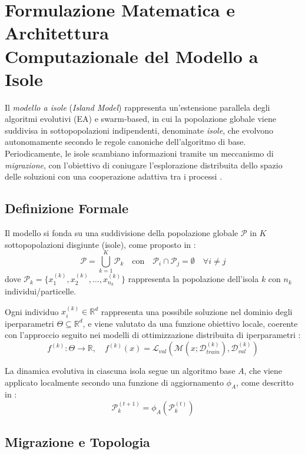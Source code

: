 \documentclass{article}
\begin{document}
\section{Formulazione Matematica e Architettura \\Computazionale del Modello a Isole}

Il \textit{modello a isole} (\textit{Island Model}) rappresenta un'estensione parallela degli algoritmi evolutivi (EA) e swarm-based, in cui la popolazione globale viene suddivisa in sottopopolazioni indipendenti, denominate \textit{isole}, che evolvono autonomamente secondo le regole canoniche dell'algoritmo di base. Periodicamente, le isole scambiano informazioni tramite un meccanismo di \textit{migrazione}, con l’obiettivo di coniugare l'esplorazione distribuita dello spazio delle soluzioni con una cooperazione adattiva tra i processi \cite{tomassini2005spatially, cantupaz1998survey}.

\subsection{Definizione Formale}

Il modello si fonda su una suddivisione della popolazione globale $\mathcal{P}$ in $K$ sottopopolazioni disgiunte (isole), come proposto in \cite{alba2002parallelism, tomassini2005spatially}:
\[
\mathcal{P} = \bigcup_{k=1}^K \mathcal{P}_k \quad \text{con} \quad \mathcal{P}_i \cap \mathcal{P}_j = \emptyset \quad \forall i \neq j
\]
dove $\mathcal{P}_k = \{x_1^{(k)}, x_2^{(k)}, \dots, x_{n_k}^{(k)}\}$ rappresenta la popolazione dell'isola $k$ con $n_k$ individui/particelle.

Ogni individuo $x_i^{(k)} \in \mathbb{R}^d$ rappresenta una possibile soluzione nel dominio degli iperparametri $\Theta \subseteq \mathbb{R}^d$, e viene valutato da una funzione obiettivo locale, coerente con l'approccio seguito nei modelli di ottimizzazione distribuita di iperparametri \cite{li2019openbox}:
\[
f^{(k)} : \Theta \to \mathbb{R}, \quad f^{(k)}(x) = \mathcal{L}_{val}(\mathcal{M}(x; \mathcal{D}_{train}^{(k)}), \mathcal{D}_{val}^{(k)})
\]

La dinamica evolutiva in ciascuna isola segue un algoritmo base $A$, che viene applicato localmente secondo una funzione di aggiornamento $\phi_A$, come descritto in \cite{kennedy1995particle, engelbrecht2007computational}:
\[
\mathcal{P}_k^{(t+1)} = \phi_A(\mathcal{P}_k^{(t)})
\]

\subsection{Migrazione e Topologia}
\end{document}
